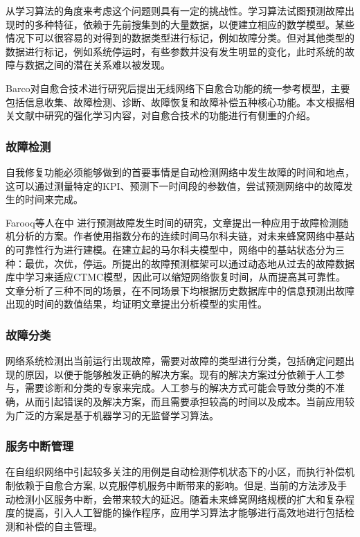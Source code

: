 ﻿\documentclass[11pt,draftclsnofoot,onecolumn,journal,letterpaper]{IEEEtran}
\begin{document}
从学习算法的角度来考虑这个问题则具有一定的挑战性。学习算法试图预测故障出现时的多种特征，依赖于先前搜集到的大量数据，以便建立相应的数学模型。某些情况下可以很容易的对得到的数据类型进行标记，例如故障分类。但对其他类型的数据进行标记，例如系统停运时，有些参数并没有发生明显的变化，此时系统的故障与数据之间的潜在关系难以被发现。

Barco\cite{Barco2012}对自愈合技术进行研究后提出无线网络下自愈合功能的统一参考模型，主要包括信息收集、故障检测、诊断、故障恢复和故障补偿五种核心功能。本文根据相关文献中研究的强化学习内容，对自愈合技术的功能进行有侧重的介绍。

\subsubsection{故障检测}
自我修复功能必须能够做到的首要事情是自动检测网络中发生故障的时间和地点，这可以通过测量特定的KPI、预测下一时间段的参数值，尝试预测网络中的故障发生的时间来完成。

Farooq等人在\cite{Farooq2015}中 进行预测故障发生时间的研究，文章提出一种应用于故障检测随机分析的方案。作者使用指数分布的连续时间马尔科夫链，对未来蜂窝网络中基站的可靠性行为进行建模。在建立起的马尔科夫模型中，网络中的基站状态分为三种：最优，次优，停运。所提出的故障预测框架可以通过动态地从过去的故障数据库中学习来适应CTMC模型，因此可以缩短网络恢复时间，从而提高其可靠性。文章分析了三种不同的场景，在不同场景下均根据历史数据库中的信息预测出故障出现的时间的数值结果，均证明文章提出分析模型的实用性。

\subsubsection{故障分类}

网络系统检测出当前运行出现故障，需要对故障的类型进行分类，包括确定问题出现的原因，以便于能够触发正确的解决方案。现有的解决方案过分依赖于人工参与，需要诊断和分类的专家来完成。人工参与的解决方式可能会导致分类的不准确，从而引起错误的及解决方案，而且需要承担较高的时间以及成本。当前应用较为广泛的方案是基于机器学习的无监督学习算法。


\subsubsection{服务中断管理}

在自组织网络中引起较多关注的用例是自动检测停机状态下的小区，而执行补偿机制依赖于自愈合方案, 以克服停机服务中断带来的影响。但是, 当前的方法涉及手动检测小区服务中断，会带来较大的延迟。随着未来蜂窝网络规模的扩大和复杂程度的提高，引入人工智能的操作程序，应用学习算法才能够进行高效地进行包括检测和补偿的自主管理。
\end{document}
